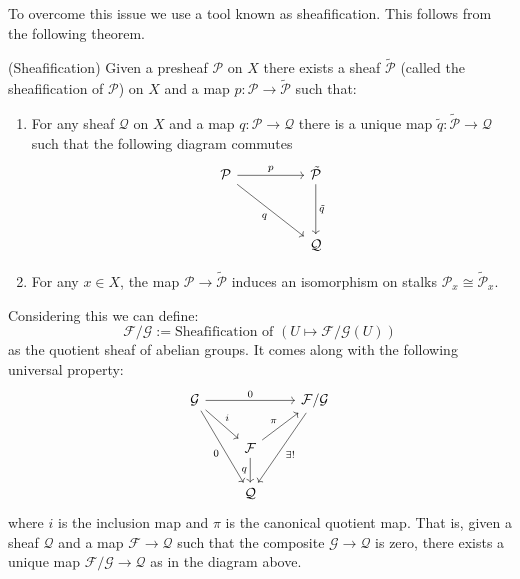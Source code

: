 To overcome this issue we use a tool known as sheafification. This follows from the following theorem.
\begin{theorem} (Sheafification) Given a presheaf $\mathcal{P}$ on $X$ there exists a sheaf $\tilde{\mathcal{P}}$ (called the sheafification of $\mathcal{P}$) on $X$ and a map $p : \mathcal{P} \to \tilde{\mathcal{P}}$ such that:
\begin{enumerate}
    \item For any sheaf $\mathcal{Q}$ on $X$ and a map $q : \mathcal{P} \to \mathcal{Q}$ there is a unique map $\tilde{q} : \tilde{\mathcal{P}} \to \mathcal{Q}$ such that the following diagram commutes
        \[\begin{tikzcd}
	{\mathcal{P}} && {\tilde{\mathcal{P}}} \\
	\\
	&& {\mathcal{Q}}
	\arrow["p", from=1-1, to=1-3]
	\arrow["q"', from=1-1, to=3-3]
	\arrow["{\tilde{q}}", from=1-3, to=3-3]
\end{tikzcd}\]
\item For any $x \in X$, the map \(\mathcal{P} \to \tilde{\mathcal{P}}\) induces an isomorphism on stalks $\mathcal{P}_x \cong \tilde{\mathcal{P}}_x$.
\end{enumerate}
\end{theorem}
\newpage 
Considering this we can define:
$$\mathcal{F}/\mathcal{G} := \text{Sheafification of } (U \mapsto \mathcal{F}/\mathcal{G}(U))$$
as the quotient sheaf of abelian groups. It comes along with the following universal property:
\[\begin{tikzcd}
	{\mathcal{G}} && {\mathcal{F}/\mathcal{G}} \\
	& {\mathcal{F}} \\
	& {\mathcal{Q}}
	\arrow["0", from=1-1, to=1-3]
	\arrow["i", from=1-1, to=2-2]
	\arrow["0"', from=1-1, to=3-2]
	\arrow["{\exists!}", from=1-3, to=3-2]
	\arrow["\pi", from=2-2, to=1-3]
	\arrow["q"', from=2-2, to=3-2]
\end{tikzcd}\]
where $i$ is the inclusion map and $\pi$ is the canonical quotient map.
That is, given a sheaf \(\mathcal{Q}\) and a map \(\mathcal{F} \to \mathcal{Q}\) such that the composite \(\mathcal{G} \to \mathcal{Q}\) is zero, there exists a unique map \(\mathcal{F}/ \mathcal{G} \to \mathcal{Q}\) as in the diagram above.

